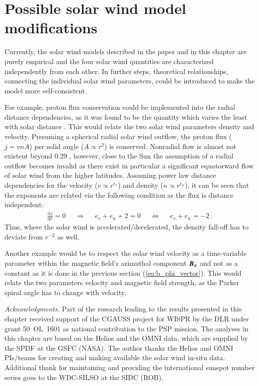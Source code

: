 \section{Possible solar wind model modifications}
\label{sec:possible_solar_wind_model_modifications}
Currently, the solar wind models described in the paper and in this chapter are purely empirical and the four solar wind quantities are characterized independently from each other. In further steps, theoretical relationships, connecting the individual solar wind parameters, could be introduced to make the model more self-consistent.

For example, proton flux conservation could be implemented into the radial distance dependencies, as it was found to be the quantity which varies the least with solar distance \citep{Schwenn1983}. This would relate the two solar wind parameters density and velocity. Presuming a spherical radial solar wind outflow, the proton flux ($j = v n A$) per solid angle ($A \propto r^2$) is conserved. Nonradial flow is almost not existent beyond \SI{0.29}{\au} \citep{Schwenn1983}, however, close to the Sun the assumption of a radial outflow becomes invalid as there exist in particular a significant equatorward flow of solar wind from the higher latitudes. Assuming power law distance dependencies for the velocity ($v \propto r^{e_v}$) and density ($n \propto r^{e_n}$), it can be seen that the exponents are related via the following condition as the flux is distance independent:
\begin{align}
	\frac{\text{d}j}{\text{d}r} = 0	&	&\Rightarrow	&	&e_v + e_n + 2 = 0	&	&\Leftrightarrow	&	&e_v + e_n = -2	\,.	\nonumber
\end{align}
Thus, where the solar wind is accelerated/decelerated, the density fall-off has to deviate from $r^{-2}$ as well.

Another example would be to respect the solar wind velocity as a time-variable parameter within the magnetic field's azimuthal component $\boldsymbol{B}_\phi$ and not as a constant as it is done in the previous section (\autoref{eq:b_phi_vector}). This would relate the two parameters velocity and magnetic field strength, as the Parker spiral angle has to change with velocity.


\bigskip
{\small
\noindent \textit{Acknowledgments.} Part of the research leading to the results presented in this chapter received support of the CGAUSS project for WISPR by the DLR under grant 50~OL~1601 as national contribution to the PSP mission.
The analyses in this chapter are based on the Helios and the OMNI data, which are supplied by the SPDF at the GSFC (NASA). The author thanks the Helios and OMNI PIs/teams for creating and making available the solar wind in-situ data. Additional thank for maintaining and providing the international sunspot number series goes to the WDC-SILSO at the SIDC (ROB).
}


\cleardoublepage

